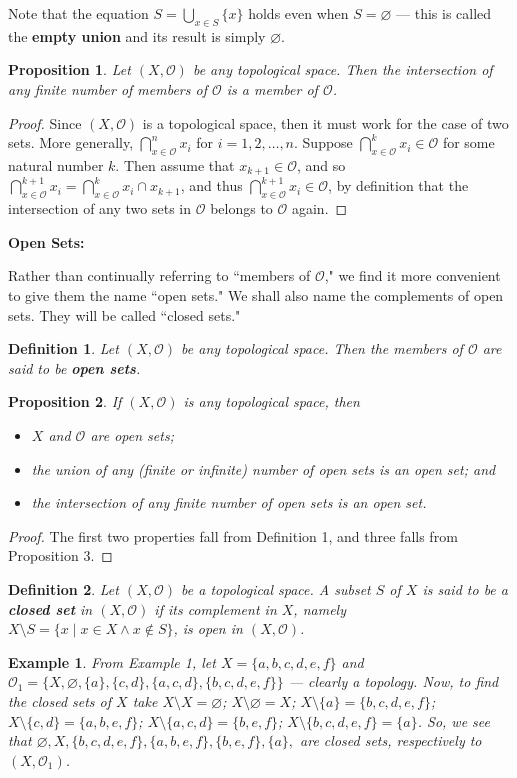 \documentclass[12pt,reqno]{amsart}
\theoremstyle{plain}
\newtheorem{defi}{Definition}
\newtheorem{prop}{Proposition}
\newtheorem{ex}{Example}
\newcommand{\oo}{\mathcal{O}}
\begin{document}
Note that the equation $S = \bigcup_{x \in S} \{ x \}$ holds even when $S = \varnothing$ — this is called the \textbf{empty union} and its result is simply $\varnothing$. 
\begin{prop} Let $(X, \oo)$ be any topological space. Then the intersection of any finite number of members of $\oo$ is a member of $\oo$. 
\end{prop} 
\begin{proof} Since $(X, \oo)$ is a topological space, then it must work for the case of two sets. More generally, $\bigcap_{x \in \oo}^n x_i$ for $i = 1, 2, \ldots, n$. Suppose $\bigcap_{x \in \oo}^k x_i \in \oo $ for some natural number $k$. Then assume that $x_{k+1} \in \oo$, and so $\bigcap_{x \in \oo}^{k+1} x_i = \bigcap_{x \in \oo}^k x_i \cap x_{k+1}$, and thus $\bigcap_{x \in \oo}^{k+1} x_i \in \oo$, by definition that the intersection of any two sets in $\oo$ belongs to $\oo$ again.
\end{proof}
\bigskip

\; \; \textbf{Open Sets:}

Rather than continually referring to ``members of $\oo$," we find it more convenient to give them the name ``open sets." We shall also name the complements of open sets. They will be called ``closed sets." 
\begin{defi} Let $(X, \oo)$ be any topological space. Then the members of $\oo$ are said to be \textup{\textbf{open sets}}. 
\end{defi} 
\begin{prop} If $(X, \oo)$ is any topological space, then 
\begin{itemize}
\item [\textup{(i)}] $X$ and $\oo$ are open sets;
\item [\textup{(ii)}] the union of any (finite or infinite) number of open sets is an open set; and 
\item [\textup{(iii)}] the intersection of any finite number of open sets is an open set. 
\end{itemize}
\end{prop} 
\begin{proof} The first two properties fall from Definition 1, and three falls from Proposition 3.
\end{proof}
\begin{defi} Let $(X, \oo)$ be a topological space. A subset $S$ of $X$ is said to be a \textup{\textbf{closed set}} in $(X, \oo)$ if its complement in $X$, namely $X \setminus S = \{ x \mid x \in X \wedge x \notin S \}$, is open in $(X, \oo)$. 
\end{defi} 
\begin{ex} From Example 1, let $X = \{a, b, c, d, e, f \}$ and $\mathcal{O}_1 = \{ X, \varnothing, \{a \}, \{c,d \}, \{a, c, d \}, \{b, c, d, e, f \} \}$ — clearly a topology. Now, to find the closed sets of $X$ take $X \setminus X = \varnothing$; $X \setminus \varnothing = X$; $X \setminus \{a \} = \{b, c, d, e, f \}$; $X \setminus \{ c, d \} = \{a, b, e, f \}$; $X \setminus \{a, c, d \} = \{b, e, f \}$; $X \setminus \{b, c, d, e, f \} = \{a \}$. So, we see that $\varnothing, X, \{b, c, d, e, f \}, \{a, b, e, f \}, \{b, e, f \}, \{ a \}, $ are closed sets, respectively to $(X, \oo_1)$.
\end{ex} 
\end{document}
